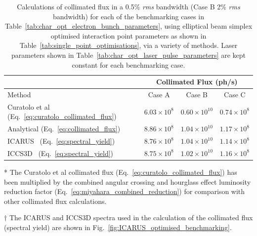 \documentclass[../main.tex]{subfiles}
\begin{document}
\begin{table}[!h]
\centering
\caption{Calculations of collimated flux in a 0.5\% \textit{rms} bandwidth (Case B 2\% \textit{rms} bandwidth) for each of the benchmarking cases in Table~\ref{tab:char_opt_electron_bunch_parameters}, using elliptical beam simplex optimised interaction point parameters as shown in Table~\ref{tab:single_point_optimisations}, via a variety of methods. Laser parameters shown in Table~\ref{tab:char_opt_laser_pulse_parameters} are kept constant for each benchmarking case.}
\vspace{3mm}
\begin{threeparttable}
\begin{tabular}{lccc}
\hline\hline
 & \multicolumn{3}{c}{Collimated Flux (ph/\si{\second})} \\
\hline
Method & Case A & Case B & Case C \\
\hline 
Curatolo et al~\tnote{*} (Eq.~\ref{eq:curatolo_collimated_flux}) \cite{curatolo2017analytical} & $6.03 \times 10^{8}$ & $0.60\times 10^{10}$ & $0.74\times 10^{8}$ \\
Analytical (Eq.~\ref{eq:collimated_flux}) & $8.86 \times 10^{8}$ & $1.04 \times 10^{10}$ & $1.17\times 10^{8}$ \\
\textsc{ICARUS}~\tnote{$\dagger$} (Eq.~\ref{eq:spectral_yield}) & $8.76\times 10^{8}$ & $1.04\times 10^{10}$ & $1.14\times 10^{8}$ \\
\textsc{ICCS3D}~\tnote{$\dagger$} (Eq.~\ref{eq:spectral_yield}) \cite{krafft2016laser,ranjan2018simulation} & $8.75\times 10^{8}$ & $1.02\times 10^{10}$ & $1.16\times 10^{8}$  \\
\hline\hline
\end{tabular}
\begin{tablenotes}
\item[*]{The Curatolo et al collimated flux (Eq.~\ref{eq:curatolo_collimated_flux}) has been multiplied by the combined angular crossing and hourglass effect luminosity reduction factor (Eq.~\ref{eq:miyahara_combined_reduction}) for comparison with other collimated flux calculations.}
\item[$\dagger$]{The \textsc{ICARUS} and \textsc{ICCS3D} spectra used in the calculation of the collimated flux (spectral yield) are shown in Fig.~\ref{fig:ICARUS_optimised_benchmarking}.}
\end{tablenotes}
\end{threeparttable}
\label{tab:collimated_flux_calculations}
\end{table}
\end{document}
